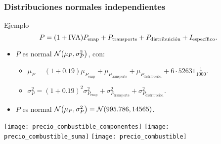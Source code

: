 \documentclass[table]{beamer}
\begin{document}
\begin{frame}
    \frametitle{Distribuciones normales independientes}
    \begin{block}{Ejemplo}
        \begin{equation*}
            P = \parens{1 + \text{IVA}} P_{\text{enap}} + P_{\text{transporte}} + P_{\text{distribuición}} + I_{\text{específico}} .
        \end{equation*}
        \begin{itemize}
            \item $P$ es normal $\normal{\mu_{P}}{\sigma^{2}_{P}}$, con:
                \begin{itemize}
                    \item $\mu_{P} = (1 + 0.19) \mu_{P_{\text{enap}}} + \mu_{P_{\text{transporte}}} + \mu_{P_{\text{distribución}}} + 6 \cdot 52631 \frac{1}{1000}$.
                    \item $\sigma^{2}_{P} = (1 + 0.19)^{2} \sigma^{2}_{P_{\text{enap}}} + \sigma^{2}_{P_{\text{transporte}}} + \sigma^{2}_{P_{\text{distribución}}}$.
                \end{itemize}
            \item $P$ es normal $\normal{\mu_{P}}{\sigma^{2}_{P}} = \normal{995.786}{14565}$.
        \end{itemize}
    \end{block}
    \begin{center}
        \texttt{[image: precio\_combustible\_componentes]}
        \texttt{[image: precio\_combustible\_suma]}
        \texttt{[image: precio\_combustible]}
    \end{center}
\end{frame}
\end{document}
